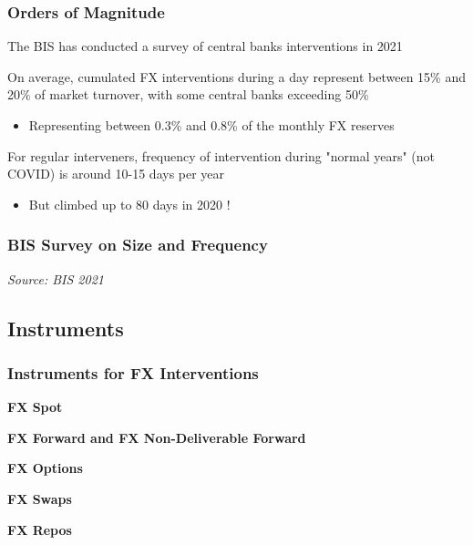 \documentclass{beamer}
\newenvironment{wideitemize}{\itemize\addtolength{\itemsep}{10pt}}{\enditemize}
\begin{document}
\begin{frame}
  \frametitle{Orders of Magnitude}
  \begin{wideitemize}
  \item The BIS has conducted a survey of central banks interventions in 2021 \href{https://www.bis.org/publ/mc_insights_fxinterventions.pdf}{}
  \item On average, cumulated FX interventions during a day represent between 15\% and 20\% of market turnover, with some central banks exceeding 50\%
    \begin{itemize}
    \item Representing between 0.3\% and 0.8\% of the monthly FX reserves
    \end{itemize}
  \item For regular interveners, frequency of intervention during "normal years" (not COVID) is around 10-15 days per year
    \begin{itemize}
    \item But climbed up to 80 days in 2020 !
    \end{itemize}
  \end{wideitemize}
\end{frame}

\begin{frame}
  \frametitle{BIS Survey on Size and Frequency}
  \medskip
  \emph{Source: BIS 2021 \href{https://www.bis.org/publ/mc_insights_fxinterventions.pdf}{}}
\end{frame}



\subsection{Instruments}
\begin{frame}
  \frametitle{Instruments for FX Interventions}
  \begin{wideitemize}
    \item \textbf{FX Spot}
    \item \textbf{FX Forward and FX Non-Deliverable Forward}
    \item \textbf{FX Options} 
    \item \textbf{FX Swaps} 
    \item \textbf{FX Repos}
  \end{wideitemize}
\end{frame}
\end{document}
